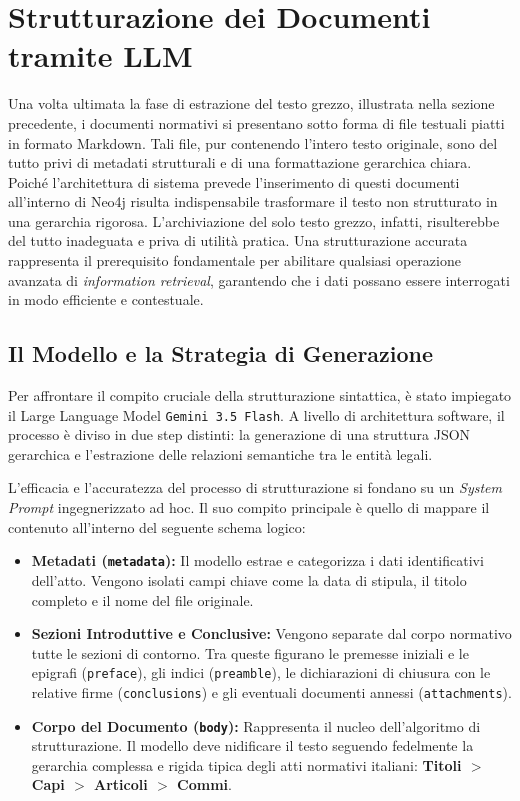 \section{Strutturazione dei Documenti tramite LLM}
\label{sec:strutturazione_semantica}

Una volta ultimata la fase di estrazione del testo grezzo, illustrata nella sezione precedente, i documenti normativi si presentano sotto forma di file testuali piatti in formato Markdown. Tali file, pur contenendo l'intero testo originale, sono del tutto privi di metadati strutturali e di una formattazione gerarchica chiara. 
Poiché l'architettura di sistema prevede l'inserimento di questi documenti all'interno di Neo4j risulta indispensabile trasformare il testo non strutturato in una gerarchia rigorosa. L'archiviazione del solo testo grezzo, infatti, risulterebbe del tutto inadeguata e priva di utilità pratica. Una strutturazione accurata rappresenta il prerequisito fondamentale per abilitare qualsiasi operazione avanzata di \textit{information retrieval}, garantendo che i dati possano essere interrogati in modo efficiente e contestuale.

\subsection{Il Modello e la Strategia di Generazione}
\label{sec:strutturazione_gerarchica}

Per affrontare il compito cruciale della strutturazione sintattica, è stato impiegato il Large Language Model \texttt{Gemini 3.5 Flash}. A livello di architettura software, il processo è diviso in due step distinti: la generazione di una struttura JSON gerarchica e l'estrazione delle relazioni semantiche tra le entità legali.

L'efficacia e l'accuratezza del processo di strutturazione si fondano su un \textit{System Prompt} ingegnerizzato ad hoc. Il suo compito principale è quello di mappare il contenuto all'interno del seguente schema logico:

\begin{itemize}
    \item \textbf{Metadati (\texttt{metadata}):} Il modello estrae e categorizza i dati identificativi dell'atto. Vengono isolati campi chiave come la data di stipula, il titolo completo e il nome del file originale.
    \item \textbf{Sezioni Introduttive e Conclusive:} Vengono separate dal corpo normativo tutte le sezioni di contorno. Tra queste figurano le premesse iniziali e le epigrafi (\texttt{preface}), gli indici (\texttt{preamble}), le dichiarazioni di chiusura con le relative firme (\texttt{conclusions}) e gli eventuali documenti annessi (\texttt{attachments}).
    \item \textbf{Corpo del Documento (\texttt{body}):} Rappresenta il nucleo dell'algoritmo di strutturazione. Il modello deve nidificare il testo seguendo fedelmente la gerarchia complessa e rigida tipica degli atti normativi italiani: \textbf{Titoli $>$ Capi $>$ Articoli $>$ Commi}.
\end{itemize}

